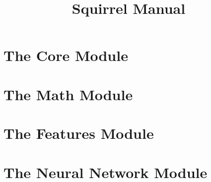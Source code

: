 \documentclass[a4paper, 10pt]{scrreprt}
\begin{document}
\title{Squirrel Manual}
\maketitle

\tableofcontents

\chapter{The Core Module}
\label{ch:core}


\chapter{The Math Module}
\label{ch:math}


\chapter{The Features Module}
\label{ch:features}


\chapter{The Neural Network Module}
\label{ch:nn}

\end{document}

